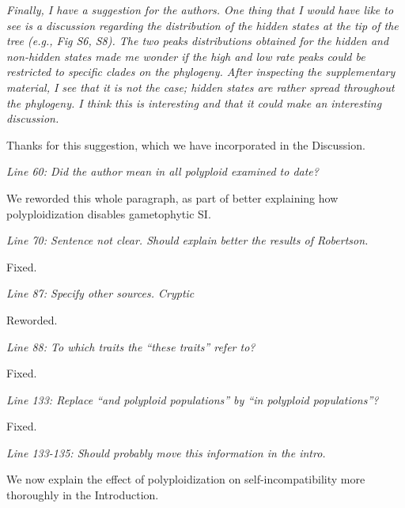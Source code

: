 \documentclass[11pt]{article}
\renewenvironment{quote}{\bigskip\noindent\itshape\ignorespaces}{\smallskip}
\begin{document}
\begin{quote}
Finally, I have a suggestion for the authors.
One thing that I would have like to see is a discussion regarding the distribution of the hidden states at the tip of the tree (e.g., Fig S6, S8).
The two peaks distributions obtained for the hidden and non-hidden states made me wonder if the high and low rate peaks could be restricted to specific clades on the phylogeny.
After inspecting the supplementary material, I see that it is not the case; hidden states are rather spread throughout the phylogeny.
I think this is interesting and that it could make an interesting discussion.
\end{quote}

Thanks for this suggestion, which we have incorporated in the Discussion. %


\begin{quote}
Line 60: Did the author mean in all polyploid examined to date?
\end{quote}

We reworded this whole paragraph, as part of better explaining how polyploidization disables gametophytic SI.

\begin{quote}
Line 70: Sentence not clear. Should explain better the results of Robertson.
\end{quote}

Fixed.

\begin{quote}
Line 87: Specify other sources. Cryptic
\end{quote}

Reworded.

\begin{quote}
Line 88: To which traits the ``these traits'' refer to?
\end{quote}

Fixed.

\begin{quote}
Line 133: Replace ``and polyploid populations'' by ``in polyploid populations''?
\end{quote}

Fixed.

\begin{quote}
Line 133-135: Should probably move this information in the intro.
\end{quote}

We now explain the effect of polyploidization on self-incompatibility more thoroughly in the Introduction.
\end{document}
